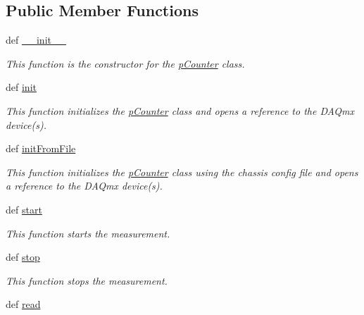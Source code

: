 \subsection*{Public Member Functions}
\begin{DoxyCompactItemize}
\item 
def \hyperlink{class_chassis_8git_1_1p_counter_1_1p_counter_a133977682f974d9c5251e6f5afeb3d1c}{\-\_\-\-\_\-init\-\_\-\-\_\-}
\begin{DoxyCompactList}\small\item\em This function is the constructor for the \hyperlink{class_chassis_8git_1_1p_counter_1_1p_counter}{p\-Counter} class. \end{DoxyCompactList}\item 
def \hyperlink{class_chassis_8git_1_1p_counter_1_1p_counter_a0a9ce5a19b35626e94d103d91e88821c}{init}
\begin{DoxyCompactList}\small\item\em This function initializes the \hyperlink{class_chassis_8git_1_1p_counter_1_1p_counter}{p\-Counter} class and opens a reference to the D\-A\-Qmx device(s). \end{DoxyCompactList}\item 
def \hyperlink{class_chassis_8git_1_1p_counter_1_1p_counter_a4b9db5d3fd9ed787f308dfc2e76707cc}{init\-From\-File}
\begin{DoxyCompactList}\small\item\em This function initializes the \hyperlink{class_chassis_8git_1_1p_counter_1_1p_counter}{p\-Counter} class using the chassis config file and opens a reference to the D\-A\-Qmx device(s). \end{DoxyCompactList}\item 
def \hyperlink{class_chassis_8git_1_1p_counter_1_1p_counter_a70605632a820fcbded267beb432fcdb4}{start}
\begin{DoxyCompactList}\small\item\em This function starts the measurement. \end{DoxyCompactList}\item 
def \hyperlink{class_chassis_8git_1_1p_counter_1_1p_counter_ab8bfeabc13832e4b7d409bfbf7c20d90}{stop}
\begin{DoxyCompactList}\small\item\em This function stops the measurement. \end{DoxyCompactList}\item 
def \hyperlink{class_chassis_8git_1_1p_counter_1_1p_counter_aa462351619f5172f6ac669b4a1ba84d3}{read}

\end{DoxyCompactItemize}
